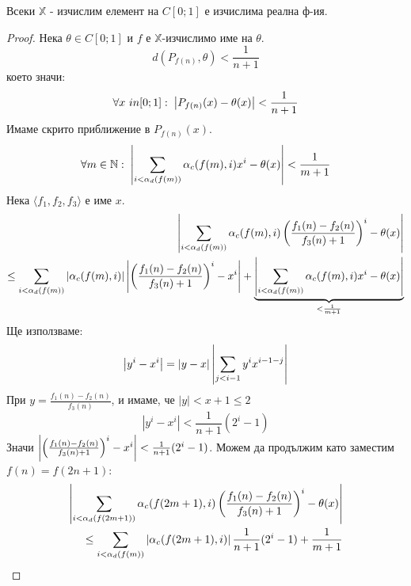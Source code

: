 \begin{theorem}
    Всеки $\mathbb X$ - изчислим елемент на $C[0; 1]$ е изчислима реална ф-ия.
\end{theorem}
\begin{proof}
    Нека $\theta \in C[0; 1]$ и $f$ е $\mathbb X$-изчислимо име на $\theta$.
    \begin{equation}
        d(P_{f(n)}, \theta) < \frac{1}{n+1}
    \end{equation}
    което значи:
    \begin{equation}
        \forall x\ in [0; 1]:\; \left|P_{f(n)}(x) - \theta(x)\right| < \frac{1}{n+1}
    \end{equation}
    Имаме скрито приближение в $P_{f(n)}(x)$.
    \begin{equation}
        \forall m\in {\mathbb{N}}:\; \left|\sum_{i < \alpha_d(f(m))} \alpha_c(f(m), i)x^i - \theta(x)\right| < \frac{1}{m+1}
    \end{equation}
    Нека $\langle f_1, f_2, f_3 \rangle$ е име $x$.
    \begin{equation}
        \begin{split}
            \left|\sum_{i < \alpha_d(f(m))} \alpha_c(f(m), i)\left(\frac{f_1(n) - f_2(n)}{f_3(n) + 1}\right)^i - \theta(x)\right|\\
            \leq \sum_{i < \alpha_d(f(m))} \left|\alpha_c(f(m), i)\right| \left|\left(\frac{f_1(n) - f_2(n)}{f_3(n) + 1}\right)^i - x^i\right| + \underbrace{\left|\sum_{i < \alpha_d(f(m))} \alpha_c(f(m), i)x^i - \theta(x)\right|}_{< \frac{1}{m+1}}
        \end{split}
    \end{equation}
    Ще използваме:
    \begin{equation}
        \left|y^i - x^i\right| = |y - x| \left|\sum_{j<i-1} y^i x^{i-1-j}\right|
    \end{equation}
    При $y = \frac{f_1(n) - f_2(n)}{f_3(n)}$, и имаме, че $|y| < x+1 \leq 2$
    \begin{equation}
        |y^i - x^i| < \frac{1}{n+1}(2^i - 1)
    \end{equation}
    Значи $\left|\left(\frac{f_1(n) - f_2(n)}{f_3(n) + 1}\right)^i - x^i\right| < \frac{1}{n+1}(2^i - 1)$. Можем да продължим като заместим $f(n) = f(2n+1)$:
    \begin{equation}
        \begin{split}
            \abs{\sum_{i < \alpha_d(f(2m+1))} \alpha_c(f(2m+1), i)\left(\frac{f_1(n) - f_2(n)}{f_3(n) + 1}\right)^i - \theta(x)}\\
            \leq \sum_{i < \alpha_d(f(m))} \abs{\alpha_c(f(2m+1), i)} \frac{1}{n+1}(2^i - 1) + \frac{1}{m+1}

\end{split}
\end{equation}
\end{proof}

